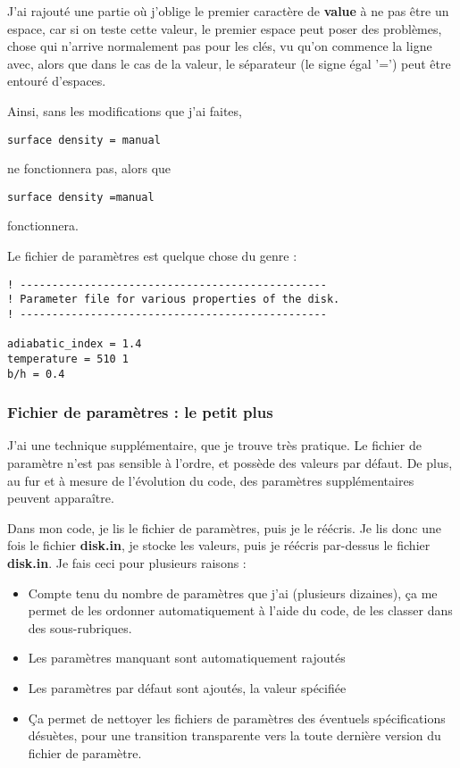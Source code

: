 \begin{attention}
J'ai rajouté une partie où j'oblige le premier caractère de \textbf{value} à ne pas être un espace, car si on teste cette
valeur, le premier espace peut poser des problèmes, chose qui n'arrive normalement pas pour les clés, vu qu'on commence la ligne
avec, alors que dans le cas de la valeur, le séparateur (le signe égal '=') peut être entouré d'espaces.

Ainsi, sans les modifications que j'ai faites, 
\begin{verbatim}
surface density = manual
\end{verbatim}
ne fonctionnera pas, alors que
\begin{verbatim}
surface density =manual
\end{verbatim}
fonctionnera.
\end{attention}


Le fichier de paramètres est quelque chose du genre :
\begin{verbatim}
! ------------------------------------------------
! Parameter file for various properties of the disk. 
! ------------------------------------------------

adiabatic_index = 1.4
temperature = 510 1
b/h = 0.4
\end{verbatim}

\subsubsection{Fichier de paramètres : le petit plus}
J'ai une technique supplémentaire, que je trouve très pratique. Le fichier de paramètre n'est pas sensible à l'ordre, et possède des valeurs par défaut. De plus, au fur et à mesure de l'évolution du code, des paramètres supplémentaires peuvent apparaître. 

Dans mon code, je lis le fichier de paramètres, puis je le réécris. Je lis donc une fois le fichier \textbf{disk.in}, je stocke les valeurs, puis je réécris par-dessus le fichier \textbf{disk.in}. Je fais ceci pour plusieurs raisons : 
\begin{itemize}
\item Compte tenu du nombre de paramètres que j'ai (plusieurs dizaines), ça me permet de les ordonner automatiquement à l'aide du code, de les classer dans des sous-rubriques. 
\item Les paramètres manquant sont automatiquement rajoutés
\item Les paramètres par défaut sont ajoutés, la valeur spécifiée
\item Ça permet de nettoyer les fichiers de paramètres des éventuels spécifications désuètes, pour une transition transparente vers la toute dernière version du fichier de paramètre.
\end{itemize}

